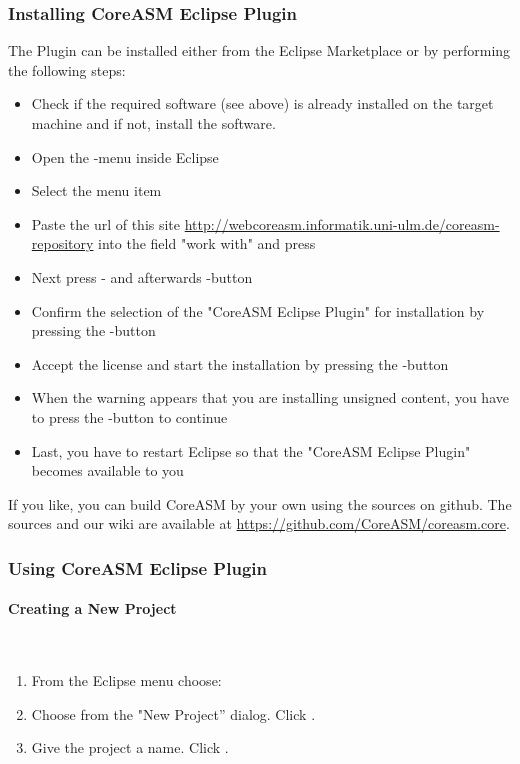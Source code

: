 \documentclass{article}
\newcommand{\CoreASM}{{\sffamily CoreASM}\xspace}
\begin{document}
\subsubsection{Installing \CoreASM Eclipse Plugin}

The Plugin can be installed either from the Eclipse Marketplace or by performing the following steps:

\begin{itemize}
\item Check if the required software (see above) is already installed on the target machine and if not, install the software.
\item Open the -menu inside Eclipse
\item Select the menu item 
\item Paste the url of this site \url{http://webcoreasm.informatik.uni-ulm.de/coreasm-repository} into the field "work with" and press 
\item Next press - and afterwards -button
\item Confirm the selection of the "CoreASM Eclipse Plugin" for installation by pressing the -button
\item Accept the license and start the installation by pressing the -button
\item When the warning appears that you are installing unsigned content, you have to press the -button to continue
\item Last, you have to restart Eclipse so that the "CoreASM Eclipse Plugin" becomes available to you
\end{itemize}

If you like, you can build CoreASM by your own using the sources on github. The sources and our wiki are available at \url{https://github.com/CoreASM/coreasm.core}.

\subsubsection{Using \CoreASM Eclipse Plugin}

\paragraph{Creating a New Project} ~

\begin{enumerate}
    \item From the Eclipse menu choose: 
    \item Choose  from the "New Project'' dialog. Click .
    \item Give the project a name. Click . 
\end{enumerate}
\end{document}
